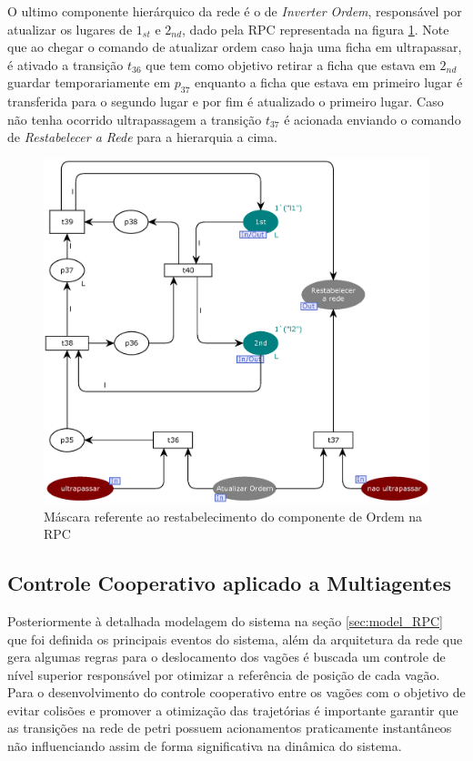 O ultimo componente hierárquico da rede é o de \textit{Inverter Ordem}, responsável por atualizar os lugares de $1_{st}$ e $2_{nd}$, dado pela RPC representada na figura \ref{fig:inverter_ordem}. Note que ao chegar o comando de atualizar ordem caso haja uma ficha em ultrapassar, é ativado a transição $t_{36}$ que tem como objetivo retirar a ficha que estava em $2_{nd}$ guardar temporariamente em $p_{37}$ enquanto a ficha que estava em primeiro lugar é transferida para o segundo lugar e por fim é atualizado o primeiro lugar.
Caso não tenha ocorrido ultrapassagem a transição $t_{37}$ é acionada enviando o comando de \textit{Restabelecer a Rede} para a hierarquia a cima.

\begin{figure}[ht]
    \centering
    \caption{Máscara referente ao restabelecimento do componente de Ordem na RPC}
    \label{fig:inverter_ordem}
    \includegraphics[width=1\linewidth]{figures/Simulation/Modelagem/inverter_ordem.eps}
\end{figure}

\subsection{Controle Cooperativo aplicado a Multiagentes}
Posteriormente à detalhada modelagem do sistema na seção \ref{sec:model_RPC} que foi definida os principais eventos do sistema, além da arquitetura da rede que gera algumas regras para o deslocamento dos vagões é buscada um controle de nível superior responsável por otimizar a referência de posição de cada vagão. Para o desenvolvimento do controle cooperativo entre os vagões com o objetivo de evitar   colisões e promover a otimização das trajetórias é importante garantir que as transições na rede de petri possuem acionamentos praticamente instantâneos não influenciando assim de forma significativa na dinâmica do sistema.

